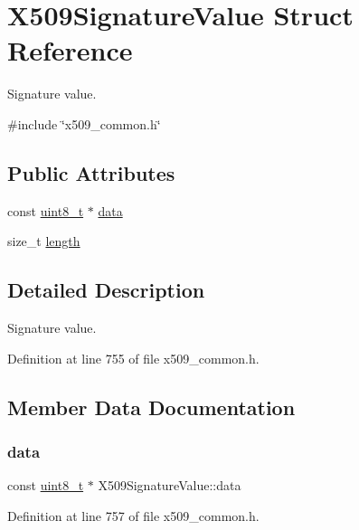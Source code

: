 \hypertarget{structX509SignatureValue}{}\section{X509\+Signature\+Value Struct Reference}
\label{structX509SignatureValue}


Signature value.  




{\ttfamily \#include \char`\"{}x509\+\_\+common.\+h\char`\"{}}

\subsection*{Public Attributes}
\begin{DoxyCompactItemize}
\item 
const \hyperlink{stdint_8h_aba7bc1797add20fe3efdf37ced1182c5}{uint8\+\_\+t} $\ast$ \hyperlink{structX509SignatureValue_a3e53e8589cdfc0c22d30e85bebfa0625}{data}
\item 
size\+\_\+t \hyperlink{structX509SignatureValue_af1bce8baf0e1a46212467145e00079d7}{length}
\end{DoxyCompactItemize}


\subsection{Detailed Description}
Signature value. 

Definition at line 755 of file x509\+\_\+common.\+h.



\subsection{Member Data Documentation}
\mbox{\label{structX509SignatureValue_a3e53e8589cdfc0c22d30e85bebfa0625}} 
\subsubsection{\texorpdfstring{data}{data}}
{\footnotesize\ttfamily const \hyperlink{stdint_8h_aba7bc1797add20fe3efdf37ced1182c5}{uint8\+\_\+t} $\ast$ X509\+Signature\+Value\+::data}



Definition at line 757 of file x509\+\_\+common.\+h.

